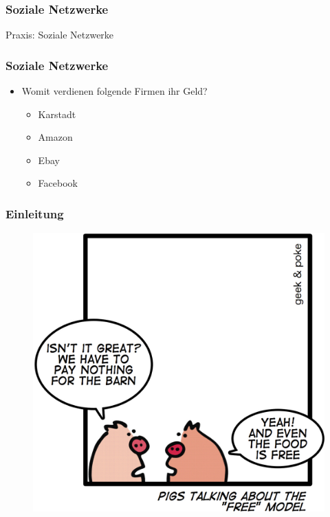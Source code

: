 \documentclass[12pt]{beamer}
\begin{document}
\begin{frame}
  \frametitle{Soziale Netzwerke}

  \begin{center} \Large
    Praxis: Soziale Netzwerke 
  \end{center}
\end{frame}

\begin{frame}
  \frametitle{Soziale Netzwerke}

  \begin{itemize}
    \item Womit verdienen folgende Firmen ihr Geld?
      \begin{itemize}
        \item<2-> Karstadt
        \item<3-> Amazon
        \item<4-> Ebay
        \item<5-> Facebook
      \end{itemize}
  \end{itemize}
\end{frame}

\begin{frame}
  \frametitle{Einleitung}
  \begin{figure}
    \includegraphics[height=0.7\textheight]{img/business_pigs.jpg}
  \end{figure}
\end{frame}
\end{document}
